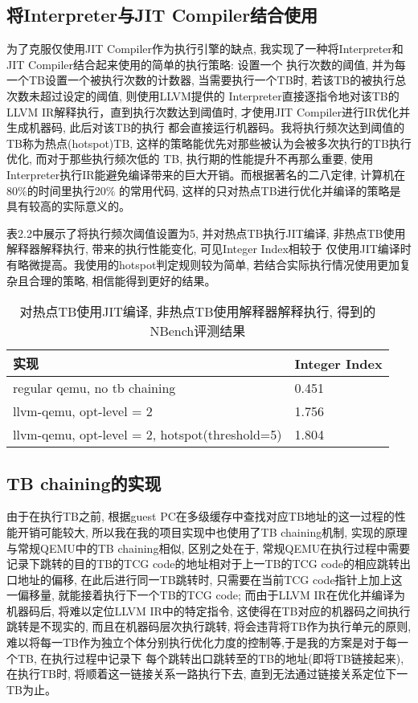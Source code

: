 \subsection{将Interpreter与JIT Compiler结合使用}
    为了克服仅使用JIT Compiler作为执行引擎的缺点, 我实现了一种将Interpreter和JIT Compiler结合起来使用的简单的执行策略: 设置一个
    执行次数的阈值, 并为每一个TB设置一个被执行次数的计数器, 当需要执行一个TB时, 若该TB的被执行总次数未超过设定的阈值, 则使用LLVM提供的
    Interpreter直接逐指令地对该TB的LLVM IR解释执行，直到执行次数达到阈值时, 才使用JIT Compiler进行IR优化并生成机器码, 此后对该TB的执行
    都会直接运行机器码。我将执行频次达到阈值的TB称为热点(hotspot)TB, 这样的策略能优先对那些被认为会被多次执行的TB执行优化, 而对于那些执行频次低的
    TB, 执行期的性能提升不再那么重要, 使用Interpreter执行IR能避免编译带来的巨大开销。而根据著名的二八定律, 计算机在80$\%$的时间里执行20$\%$
    的常用代码, 这样的只对热点TB进行优化并编译的策略是具有较高的实际意义的。

    表2.2中展示了将执行频次阈值设置为5, 并对热点TB执行JIT编译, 非热点TB使用解释器解释执行, 带来的执行性能变化, 可见Integer Index相较于
    仅使用JIT编译时有略微提高。我使用的hotspot判定规则较为简单, 若结合实际执行情况使用更加复杂且合理的策略, 相信能得到更好的结果。

    \begin{table}[htbp]
    \begin{minipage}{0.8\textwidth}
    \centering
    \caption{对热点TB使用JIT编译, 非热点TB使用解释器解释执行, 得到的NBench评测结果}
    \label{tab:parallel1}
    \begin{tabular}{p{4cm}p{4cm}}
    \toprule[1.5pt]
    实现 & Integer Index \\\midrule[1pt]
    regular qemu, no tb chaining & 0.451 \\\midrule[1pt]
    llvm-qemu, opt-level = 2 & 1.756 \\\midrule[1pt]
    llvm-qemu, opt-level = 2, hotspot(threshold=5) & 1.804 \\\bottomrule[1.5pt]
    \end{tabular}
    \end{minipage}%
    \end{table}


\subsection{TB chaining的实现}
    由于在执行TB之前, 根据guest PC在多级缓存中查找对应TB地址的这一过程的性能开销可能较大, 所以我在我的项目实现中也使用了TB chaining机制,
    实现的原理与常规QEMU中的TB chaining相似, 区别之处在于, 常规QEMU在执行过程中需要记录下跳转的目的TB的TCG code的地址相对于上一TB的TCG code的相应跳转出口地址的偏移,
    在此后进行同一TB跳转时, 只需要在当前TCG code指针上加上这一偏移量, 就能接着执行下一个TB的TCG code; 而由于LLVM IR在优化并编译为机器码后, 将难以定位LLVM IR中的特定指令,
    这使得在TB对应的机器码之间执行跳转是不现实的, 而且在机器码层次执行跳转, 将会违背将TB作为执行单元的原则, 难以将每一TB作为独立个体分别执行优化力度的控制等,于是我的方案是对于每一个TB, 在执行过程中记录下
    每个跳转出口跳转至的TB的地址(即将TB链接起来), 在执行TB时, 将顺着这一链接关系一路执行下去, 直到无法通过链接关系定位下一TB为止。

